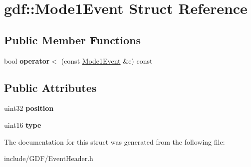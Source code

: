 \hypertarget{structgdf_1_1_mode1_event}{
\section{gdf::Mode1Event Struct Reference}
\label{structgdf_1_1_mode1_event}
}
\subsection*{Public Member Functions}
\begin{DoxyCompactItemize}
\item 
\hypertarget{structgdf_1_1_mode1_event_aa3c06e75446dba917c427d706952c407}{
bool {\bfseries operator$<$} (const \hyperlink{structgdf_1_1_mode1_event}{Mode1Event} \&e) const }
\label{structgdf_1_1_mode1_event_aa3c06e75446dba917c427d706952c407}

\end{DoxyCompactItemize}
\subsection*{Public Attributes}
\begin{DoxyCompactItemize}
\item 
\hypertarget{structgdf_1_1_mode1_event_a8e52848bd8d87dc2d609925c8eed0fa1}{
uint32 {\bfseries position}}
\label{structgdf_1_1_mode1_event_a8e52848bd8d87dc2d609925c8eed0fa1}

\item 
\hypertarget{structgdf_1_1_mode1_event_aa66f9619b5af94eaca1cfc9fc8de1c4d}{
uint16 {\bfseries type}}
\label{structgdf_1_1_mode1_event_aa66f9619b5af94eaca1cfc9fc8de1c4d}

\end{DoxyCompactItemize}


The documentation for this struct was generated from the following file:\begin{DoxyCompactItemize}
\item 
include/GDF/EventHeader.h\end{DoxyCompactItemize}
